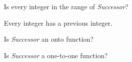 \documentclass{ximera}
\begin{document}
\begin{question} 
Is every integer in the range of \textit{Successor}?


\begin{multipleChoice}
\end{multipleChoice}
\begin{feedback}
Every integer has a previous integer.  
\end{feedback}
\end{question} 



\begin{question} 
Is \textit{Successor} an onto function?
\begin{multipleChoice}
\end{multipleChoice}
\end{question} 



\begin{question} 
Is \textit{Successor} a one-to-one function?
\begin{multipleChoice}
\end{multipleChoice}
\end{question} 
\end{document}
